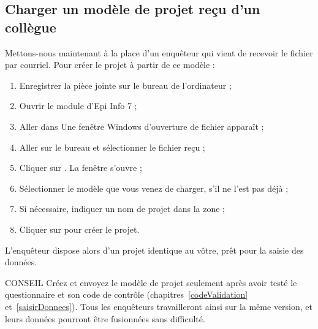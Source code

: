 \subsection{Charger un modèle de projet reçu d'un collègue}

Mettons-nous maintenant à la place d'un enquêteur qui vient de recevoir le fichier  par courriel. Pour créer le projet à partir de ce modèle :

\begin{enumerate}
	\item Enregistrer la pièce jointe sur le bureau de l'ordinateur ;
	\item Ouvrir le module  d'Epi Info 7 ;
	\item Aller dans  Une fenêtre Windows d'ouverture de fichier apparaît ;
	\item Aller sur le bureau et sélectionner le fichier reçu ;
	\item Cliquer sur . La fenêtre  s'ouvre ;
	\item Sélectionner le modèle que vous venez de charger, s'il ne l'est pas déjà ;
	\item Si nécessaire, indiquer un nom de projet dans la zone  ;
	\item Cliquer sur  pour créer le projet.
\end{enumerate}

L'enquêteur dispose alors d'un projet identique au vôtre, prêt pour la saisie des données.

\begin{mybox}[colbacktitle=TIP]{\faLightbulb{} CONSEIL}
Créez et envoyez le modèle de projet seulement après avoir testé le questionnaire et son code de contrôle (chapitres~\ref{codeValidation} et~\ref{saisirDonnees}). Tous les enquêteurs travailleront ainsi sur la même version, et leurs données pourront être fusionnées sans difficulté.
\end{mybox}
